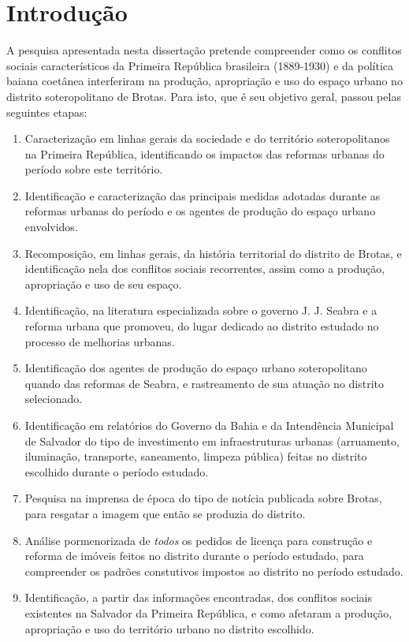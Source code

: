 \chapter[Introdução]{Introdução}\label{ch:intro}

A pesquisa apresentada nesta dissertação pretende compreender como os conflitos sociais característicos da Primeira República brasileira (1889-1930) e da política baiana coetânea interferiram na produção, apropriação e uso do espaço urbano no distrito soteropolitano de Brotas. Para isto, que é seu objetivo geral, passou pelas seguintes etapas:

\begin{enumerate}
\item Caracterização em linhas gerais da sociedade e do território soteropolitanos na Primeira República, identificando os impactos das reformas urbanas do período sobre este território.
\item Identificação e caracterização das principais medidas adotadas durante as reformas urbanas do período e os agentes de produção do espaço urbano envolvidos.
\item Recomposição, em linhas gerais, da história territorial do distrito de Brotas, e identificação nela dos conflitos sociais recorrentes, assim como a produção, apropriação e uso de seu espaço.
\item Identificação, na literatura especializada sobre o governo J. J. Seabra e a reforma urbana que promoveu, do lugar dedicado ao distrito estudado no processo de melhorias urbanas.
\item Identificação dos agentes de produção do espaço urbano soteropolitano quando das reformas de Seabra, e rastreamento de sua atuação no distrito selecionado.
\item Identificação em relatórios do Governo da Bahia e da Intendência Municipal de Salvador do tipo de investimento em infraestruturas urbanas (arruamento, iluminação, transporte, saneamento, limpeza pública) feitas no distrito escolhido durante o período estudado.
\item Pesquisa na imprensa de época do tipo de notícia publicada sobre Brotas, para resgatar a imagem que então se produzia do distrito.
\item Análise pormenorizada de \textit{todos} os pedidos de licença para construção e reforma de imóveis feitos no distrito durante o período estudado, para compreender os padrões constutivos impostos ao distrito no período estudado.
\item Identificação, a partir das informações encontradas, dos conflitos sociais existentes na Salvador da Primeira República, e como afetaram a produção, apropriação e uso do território urbano no distrito escolhido.
\end{enumerate}

